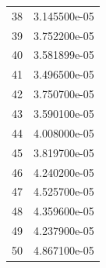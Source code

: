 \documentclass[letterpaper, 11pt]{article}
\begin{document}
\begin{longtable}{rr}
   38 &  3.145500e-05 \\
   39 &  3.752200e-05 \\
   40 &  3.581899e-05 \\
   41 &  3.496500e-05 \\
   42 &  3.750700e-05 \\
   43 &  3.590100e-05 \\
   44 &  4.008000e-05 \\
   45 &  3.819700e-05 \\
   46 &  4.240200e-05 \\
   47 &  4.525700e-05 \\
   48 &  4.359600e-05 \\
   49 &  4.237900e-05 \\
   50 &  4.867100e-05 \\
\end{longtable}
\end{document}
